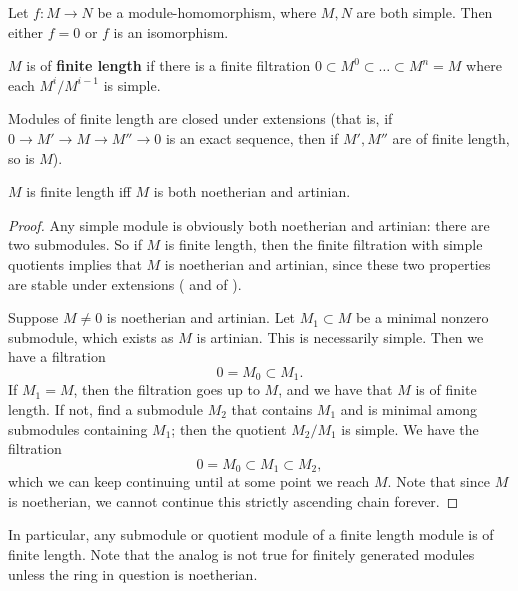 \begin{exercise} Let $f: M \to N$ be a module-homomorphism,
where $M, N$ are both simple. Then either $f =0$ or $f$ is an isomorphism. 
\end{exercise} 

\begin{definition} 
$M$ is of \textbf{finite length} if there is a finite filtration $0 \subset M^0
\subset \dots \subset M^n = M$ where each $M^i/M^{i-1}$ is simple.
\end{definition} 

\begin{exercise} 
Modules of finite length are closed under extensions (that is, if $0 \to M'
\to M \to M'' \to 0$ is an exact sequence, then if $M', M''$ are of finite
length, so is $M$).  
\end{exercise} 

\begin{proposition} 
$M$ is finite length iff $M$ is both noetherian and artinian.
\end{proposition} 
\begin{proof} 
Any simple module is obviously both noetherian and artinian: there are two
submodules. So if $M$ is finite length, then the finite filtration with simple
quotients implies that $M$ is noetherian and artinian, since these two
properties are stable under extensions (
and  of ).

Suppose $M \neq 0$ is noetherian and artinian. Let $M_1 \subset M$ be a minimal
nonzero submodule, which exists as $M$ is artinian. This is necessarily simple. Then we have a filtration
\[ 0 = M_0 \subset M_1.  \]
If $M_1 = M$, then the filtration goes up to $M$, and we have that $M$ is of
finite length. If not, find a submodule $M_2$ that contains $M_1$ and is
minimal among submodules containing $M_1$; then the quotient
$M_2/M_1$ is simple. We have the filtration
\[ 0 = M_0 \subset M_1 \subset M_2,  \]
which we can keep continuing until at some point we reach $M$. Note that since
$M$ is noetherian, we cannot continue this strictly ascending chain forever. 
\end{proof} 

\begin{exercise} 
In particular, any submodule or quotient module of a finite length module is
of finite length. Note that the analog is not true for finitely generated
modules unless the ring in question is noetherian.
\end{exercise} 

